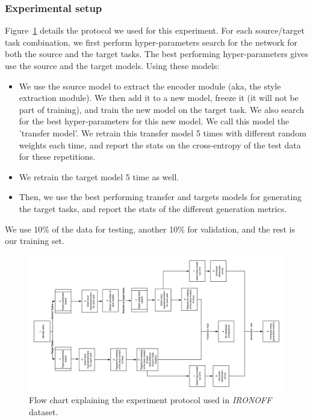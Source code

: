     \subsubsection{Experimental setup}
      \par Figure~\ref{fig:ironoff_protocol} details the protocol we used for this experiment. For each source/target task combination, we first perform hyper-parameters search for the network for both the source and the target tasks. The best performing hyper-parameters gives use the source and the target models. Using these models:
      \begin{itemize}
        \item We use the source model to extract the encoder module (aka, the style extraction module). We then add it to a new model, freeze it (it will not be part of training), and train the new model on the target task. We also search for the best hyper-parameters for this new model. We call this model the 'transfer model'. We retrain this transfer model 5 times with different random weights each time, and report the stats on the cross-entropy of the test data for these repetitions.
        \item We retrain the target model 5 time as well.
        \item Then, we use the best performing transfer and targets models for generating the target tasks, and report the stats of the different generation metrics.
      \end{itemize}
      \par We use 10\% of the data for testing, another 10\% for validation, and the rest is our training set.

    \begin{figure}
      \includegraphics[scale=0.3]{images/sota/ironoff_results/IRONOFF_transfer_learning_flow.png}
      \caption[\textit{IRONOFF} experimental protocol]{Flow chart explaining the experiment protocol used in \textit{IRONOFF} dataset.}
      \label{fig:ironoff_protocol}
    \end{figure}


